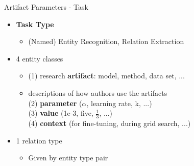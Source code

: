 \documentclass[en,16:9,smallfoot]{sdqbeamer}
\begin{document}
   \begin{frame}{Artifact Parameters - Task}
   \begin{itemize}
       \item \textbf{Task Type}
       \begin{itemize}
           \item (Named) Entity Recognition, Relation Extraction
       \end{itemize}
       \item 4 entity classes
       \begin{itemize}
           \item (1) research \textbf{artifact}: model, method, data set, ...
           \item descriptions of how authors use the artifacts\\
                (2) \textbf{parameter} ($\alpha$, learning rate, k, ...)\\
                (3) \textbf{value} (1e-3, five, $\frac{1}{3}$, ...)\\
                (4) \textbf{context} (for fine-tuning, during grid search, ...)
       \end{itemize}
       \item 1 relation type
       \begin{itemize}
           \item Given by entity type pair
       \end{itemize}
   \end{itemize}
   \end{frame}
\end{document}
